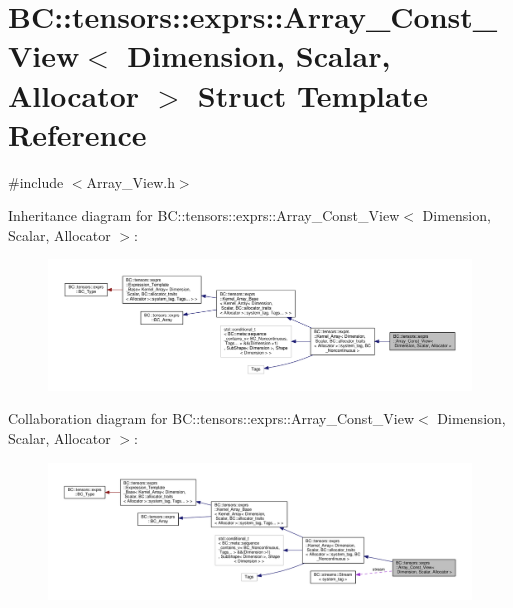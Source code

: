 \hypertarget{structBC_1_1tensors_1_1exprs_1_1Array__Const__View}{}\section{BC\+:\+:tensors\+:\+:exprs\+:\+:Array\+\_\+\+Const\+\_\+\+View$<$ Dimension, Scalar, Allocator $>$ Struct Template Reference}
\label{structBC_1_1tensors_1_1exprs_1_1Array__Const__View}


{\ttfamily \#include $<$Array\+\_\+\+View.\+h$>$}



Inheritance diagram for BC\+:\+:tensors\+:\+:exprs\+:\+:Array\+\_\+\+Const\+\_\+\+View$<$ Dimension, Scalar, Allocator $>$\+:
\nopagebreak
\begin{figure}[H]
\begin{center}
\leavevmode
\includegraphics[width=350pt]{structBC_1_1tensors_1_1exprs_1_1Array__Const__View__inherit__graph}
\end{center}
\end{figure}


Collaboration diagram for BC\+:\+:tensors\+:\+:exprs\+:\+:Array\+\_\+\+Const\+\_\+\+View$<$ Dimension, Scalar, Allocator $>$\+:
\nopagebreak
\begin{figure}[H]
\begin{center}
\leavevmode
\includegraphics[width=350pt]{structBC_1_1tensors_1_1exprs_1_1Array__Const__View__coll__graph}
\end{center}
\end{figure}
